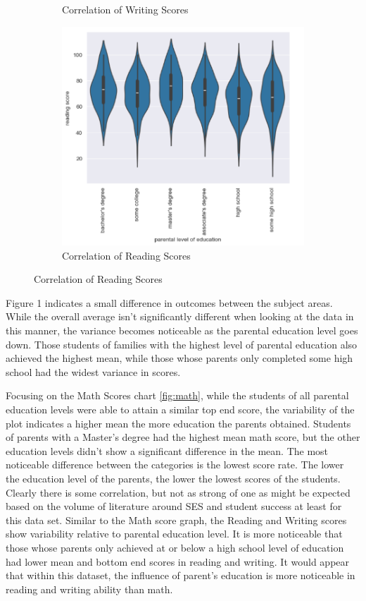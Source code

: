 \documentclass[doc]{apa6} %
\begin{document}
\begin{figure}[H]
\begin{subfigure}[b]{0.28\textwidth}
    \caption{Correlation of Writing Scores}
    \label{fig:read}
    \end{subfigure}
    \begin{subfigure}[b]{0.28\textwidth}
    \includegraphics[width=\linewidth]{ReadingVsParent.png}
    \caption{Correlation of Reading Scores}
    \label{fig:write}
    \end{subfigure}
\end{figure}

Figure 1 indicates a small difference in outcomes between the subject areas. While the overall average isn't significantly different when looking at the data in this manner, the variance becomes noticeable as the parental education level goes down. Those students of families with the highest level of parental education also achieved the highest mean, while those whose parents only completed some high school had the widest variance in scores.

Focusing on the Math Scores chart \ref{fig:math}, while the students of all parental education levels were able to attain a similar top end score, the variability of the plot indicates a higher mean the more education the parents obtained.  Students of parents with a Master's degree had the highest mean math score, but the other education levels didn't show a significant difference in the mean.  The most noticeable difference between the categories is the lowest score rate. The lower the education level of the parents, the lower the lowest scores of the students.  Clearly there is some correlation, but not as strong of one as might be expected based on the volume of literature around SES and student success at least for this data set.
Similar to the Math score graph, the Reading and Writing scores show variability relative to parental education level.  It is more noticeable that those whose parents only achieved at or below a high school level of education had lower mean and bottom end scores in reading and writing. It would appear that within this dataset, the influence of parent's education is more noticeable in reading and writing ability than math.
\end{document}
